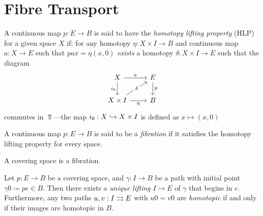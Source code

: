 \section{Fibre Transport}

\begin{definition}
    \label{def:homotopy-lifting-property}
    A continuous map \(p: E \to B\) is said to have the \emph{homotopy lifting
        property} (HLP) for a given space \(X\) if: for any homotopy \(\eta: X \times
    I \to B\) and continuous map \(a: X \to E\) such that \(p a x = \eta(x, 0)\)
    \emph{exists} a homotopy \(\delta: X \times I \to E\) such that the diagram
    \[
        \begin{tikzcd}
            X \ar[r, "a"] \ar[d, "i_0"']
            &E \ar[d, "p"] \\
            X \times I \ar[ru, "\delta" description]
            \ar[r, "\eta"']
            &B
        \end{tikzcd}
    \]
    commutes in \(\Top\)---the map \(i_0: X \hookrightarrow X \times I\) is defined as
    \(x \mapsto (x, 0)\)
\end{definition}


\begin{definition}[Fibration]
    \label{def:fibration}
    A continuous map \(p: E \to B\) is said to be a \emph{fibration} if it satisfies
    the homotopy lifting property for every space.
\end{definition}

\begin{theorem}
    \label{thm:coverings-are-fibrations}
    A covering space is a fibration.
\end{theorem}


\begin{proposition}
    \label{prop:path-lifting}
    Let \(p: E \to B\) be a covering space, and \(\gamma: I \to B\) be a path with
    initial point \(\gamma 0 \coloneq p e \in B\). Then there exists a \emph{unique
        lifting} \(I \to E\) of \(\gamma\) that begins in \(e\). Furthermore, any two
    paths \(u, v: I \rightrightarrows E\) with \(u 0 = v 0\) are \emph{homotopic} if and only if
    their images are homotopic in \(B\).
\end{proposition}

